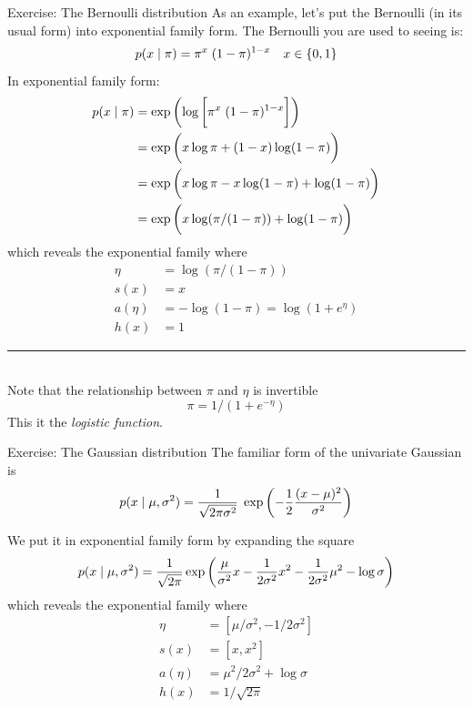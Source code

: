 \documentclass[10pt]{beamer}
\renewcommand{\it}[1]{\textit{{#1}}}
\newcommand{\bp}[1]{\bigg(  {#1} \bigg)}
\newcommand{\bb}[1]{\bigg[  {#1} \bigg]}
\begin{document}
\begin{frame}{Exercise: The Bernoulli distribution}
\footnotesize
As an example, let's put the Bernoulli (in its usual form) into exponential family form.   The Bernoulli you are used to seeing is:
\[ p(x \; | \; \pi) = \pi^x \; (1-\pi)^{1-x} \quad x \in \{ {0,1} \} \] 
\pause
In exponential family form:
\begin{align*}
 p(x \cond \pi) &= \exp \bp{  \log \bb{\pi^x \; (1-\pi)^{1-x} }} \\
 &= \exp \bp{ x \log \pi + (1-x) \log (1-\pi)} \\
 &= \exp \bp{x \log \pi - x \log (1-\pi) + \log (1-\pi)} \\
&= \exp \bp{x \log (\pi/(1-\pi)) + \log (1-\pi) } 
 \end{align*}
 which reveals the exponential family where
 \begin{align*}
\eta &= \log(\pi / (1-\pi) ) \\
s(x) &= x\\
a(\eta) &= -\log (1-\pi) = \log (1 + e^\eta) \\
h(x) &=  1
 \end{align*}
\noindent\rule{2cm}{.4pt} \\
\tiny  Note that the relationship between $\pi$ and $\eta$ is invertible
\[ \pi = 1/(1 + e^{-\eta})\] 
 This it the \it{logistic function}.


\end{frame}

\begin{frame}{Exercise: The Gaussian distribution}
\footnotesize
The familiar form of the univariate Gaussian is 
\[ p(x \cond \mu, \sigma^2) = \df{1}{\sqrt{2 \pi \sigma^2}} \; \exp \bp{ - \df{1}{2} \df{(x-\mu)^2}{\sigma^2}}  \] 
\pause

We put it in exponential family form by expanding the square
\begin{align*}
 p(x \cond \mu, \sigma^2) = \df{1}{\sqrt{2 \pi}} \exp \bp{ \df{\mu}{\sigma^2} x - \df{1}{2 \sigma^2} x^2 - \df{1}{2 \sigma^2} \mu^2 - \log \sigma}
 \end{align*}
 which reveals the exponential family where
 \begin{align*}
\eta &= [\mu/\sigma^2, -1/2 \sigma^2 ]\\
s(x) &= [x, x^2] \\
a(\eta) &= \mu^2/2\sigma^2 + \log \sigma \\
h(x) &=  1/\sqrt{2 \pi}
 \end{align*}



\end{frame}
\end{document}
